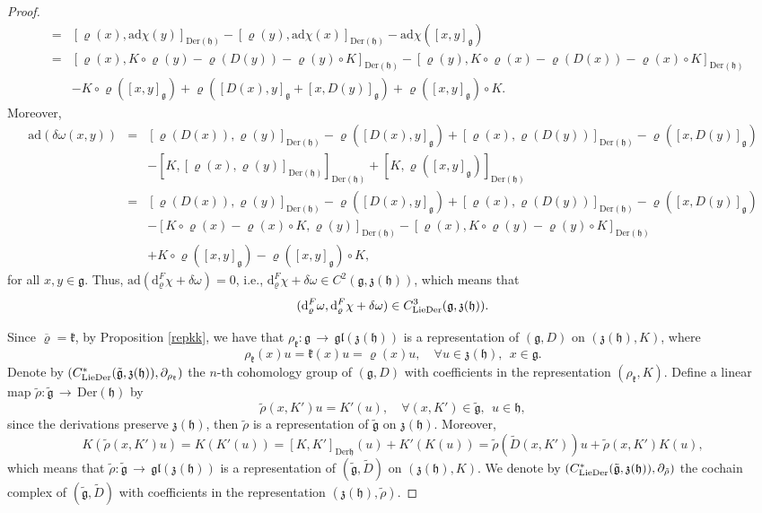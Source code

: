 \documentclass[12pt]{amsart}
\newcommand{\lon }{\,\rightarrow\,}
\newcommand{\g}{\mathfrak g}
\newcommand{\h}{\mathfrak h}
\newcommand{\frkk}{\mathfrak k}
\newcommand{\frkz}{\mathfrak z}
\newcommand{\dM}{\mathrm{d}}
\newcommand{\LD}{{\rm LieDer }}
\newcommand{\Der}{\mathrm{Der}}
\newcommand{\gl}{\mathfrak {gl}}
\newcommand{\ad}{\mathrm{ad}}
\begin{document}
\begin{proof}
\begin{eqnarray*}
         &=&[\varrho(x),\ad\chi(y)]_{\Der(\h)}-[\varrho(y),\ad\chi(x)]_{\Der(\h)}-\ad\chi([x,y]_{\g})\\
         &=&[\varrho(x),K\circ\varrho(y)-\varrho(D(y))-\varrho(y)\circ K]_{\Der(\h)}-[\varrho(y),K\circ\varrho(x)-\varrho(D(x))-\varrho(x)\circ K]_{\Der(\h)}\\
         &&-K\circ\varrho([x,y]_{\g})+\varrho([D(x),y]_{\g}+[x,D(y)]_{\g})+\varrho([x,y]_{\g})\circ K.
    \end{eqnarray*}
   Moreover,
    \begin{eqnarray*}
        \ad (\delta\omega(x,y))%
        &=&[\varrho (D(x)),\varrho (y)]_{\Der(\h)}-\varrho([D(x),y]_{\g})+[\varrho(x),\varrho(D(y))]_{\Der(\h)}-\varrho([x,D(y)]_{\g})\\
        &&-[K,[\varrho (x),\varrho (y)]_{\Der(\h)}]_{\Der(\h)}+[K,\varrho([x,y]_{\g})]_{\Der(\h)}\\
        &=&[\varrho (D(x)),\varrho (y)]_{\Der(\h)}-\varrho([D(x),y]_{\g})+[\varrho(x),\varrho(D(y))]_{\Der(\h)}-\varrho([x,D(y)]_{\g})\\
        &&-[K\circ\varrho(x)-\varrho(x)\circ K,\varrho(y)]_{\Der(\h)}-[\varrho(x), K\circ\varrho(y)-\varrho(y)\circ K]_{\Der(\h)}\\
        &&+K\circ \varrho([x,y]_{\g})-\varrho([x,y]_{\g})\circ K,
    \end{eqnarray*}
    for all $x,y\in\g$. Thus, $\ad (\dM^F_{\varrho}\chi+\delta\omega)=0$, i.e., $\dM^F_{\varrho}\chi+\delta\omega\in C^2(\g,\frkz(\h))$, which means that $$(\dM^F_{\varrho}\omega,\dM^F_{\varrho}\chi+\delta\omega)\in C^3_{\LD}(\g,\frkz(\h)).$$

Since $\overline{\varrho}=\frkk$, by Proposition \ref{repkk}, we have that $\rho_{\frkk}:\g\lon\gl(\frkz(\h))$ is a representation of $(\g,D)$ on $(\frkz(\h),K)$, where
$$
\rho_{\frkk}(x)u=\frkk(x)u=\varrho(x)u, \quad \forall u\in\frkz(\h),  ~~x\in\g.
$$
Denote by $(C_{\LD}^*(\tilde{\g}, \frkz(\h)), \partial_{\rho_\frkk})$ the $n$-th cohomology group of $(\g, D)$ with coefficients in the representation $(\rho_\frkk, K)$. %
Define a linear map $\tilde{\rho}:\tilde{\g}\lon\Der(\h)$ by $$\tilde{\rho}(x, K')u=K'(u), \quad \forall (x, K')\in\tilde{\g}, ~~u\in\h, $$
since the derivations preserve $\frkz(\h)$, then $\tilde{\rho}$ is a representation of $\tilde{\g}$ on $\frkz(\h)$. Moreover, 
$$
K(\tilde{\rho}(x, K')u)=K(K'(u))=[K, K']_{\Der{\h}}(u)+K'(K(u))=\tilde{\rho}(\tilde{D}(x, K'))u+\tilde{\rho}(x, K')K(u),
$$
which means that $\tilde{\rho}:\tilde{\g}\lon\gl(\frkz(\h))$ is a representation of $(\tilde{\g}, \tilde{D})$ on $(\frkz(\h), K)$. We denote by $(C_{\LD}^*(\tilde{\g}, \frkz(\h)), \partial_{\tilde{\rho}})$ the cochain complex of $(\tilde{\g}, \tilde{D})$ with coefficients in the representation $(\frkz(\h), \tilde{\rho})$. 
 


\end{proof}
\end{document}
